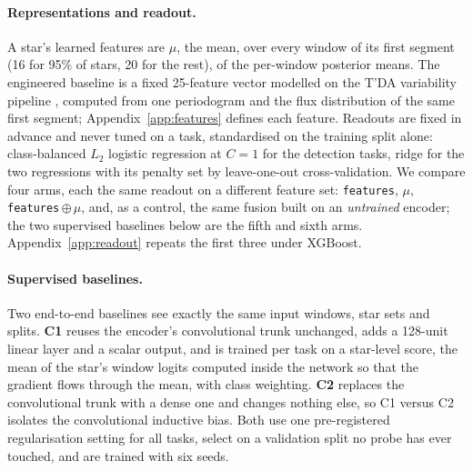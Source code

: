 \documentclass{article}
\begin{document}
\paragraph{Representations and readout.} A star's learned features are $\mu$, the mean, over every
window of its first segment (16 for 95\% of stars, 20 for the rest), of the per-window posterior
means. The engineered baseline is a fixed 25-feature vector modelled on the T'DA variability pipeline
\citep{audenaert2021}, computed from one periodogram and the flux distribution of the same first
segment; Appendix~\ref{app:features} defines each feature. Readouts are fixed in advance and never
tuned on a task, standardised on the training split alone: class-balanced $L_{2}$ logistic regression
at $C = 1$ for the detection tasks, ridge for the two regressions with its penalty set by leave-one-out
cross-validation. We compare four
arms, each the same readout on a different feature set: \texttt{features}, $\mu$,
\texttt{features}\,$\oplus\,\mu$, and, as a control, the same fusion built on an \emph{untrained}
encoder; the two supervised baselines below are the fifth and sixth arms.
Appendix~\ref{app:readout} repeats the first three under XGBoost.

\paragraph{Supervised baselines.} Two end-to-end baselines see exactly the same input windows, star
sets and splits. \textbf{C1} reuses the encoder's convolutional trunk unchanged, adds a 128-unit linear layer
and a scalar output, and is trained per task on a star-level score, the mean of the star's window
logits computed inside the network so that the gradient flows through the mean, with class
weighting. \textbf{C2} replaces the convolutional trunk with a
dense one and changes nothing else, so C1 versus C2 isolates the convolutional inductive bias. Both
use one pre-registered regularisation setting for all tasks, select on a validation split no probe
has ever touched, and are trained with six seeds.
\end{document}
